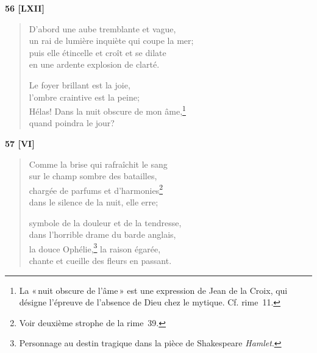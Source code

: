 \bigskip

\begin{center}
  \textbf{56 [LXII]}
\end{center}


\begin{verse}
  D'abord une aube tremblante et vague, \\
  un rai de lumière inquiète qui coupe la mer; \\
  puis elle étincelle et croît et se dilate \\
  en une ardente explosion de clarté.

  Le foyer brillant est la joie, \\
  l'ombre craintive est la peine; \\
  Hélas! Dans la nuit obscure de mon âme,\footnote{La «\,nuit obscure de
  l'âme\,» est une expression de Jean de la Croix, qui
  désigne l'épreuve de l'absence de Dieu chez le
  mytique. Cf. rime~11.} \\
  quand poindra le jour?
\end{verse}

\bigskip

\begin{center}
  \textbf{57 [VI]}
\end{center}


\begin{verse}
  Comme la brise qui rafraîchit le sang \\
  sur le champ sombre des batailles, \\
  chargée de parfums et d'harmonies\footnote{Voir deuxième strophe de
  la rime~39.} \\
  dans le silence de la nuit, elle erre;

  symbole de la douleur et de la tendresse, \\
  dans l'horrible drame du barde anglais, \\
  la douce Ophélie,\footnote{Personnage au destin tragique dans la
  pièce de Shakespeare \emph{Hamlet}.} la  raison égarée, \\
  chante et cueille des fleurs en passant.
\end{verse}

